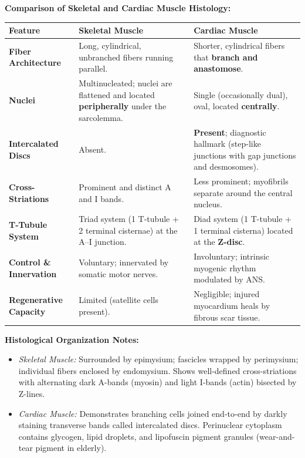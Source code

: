 \documentclass[11pt,a4paper]{article}
\begin{document}
\begin{ansbox}
\textbf{Comparison of Skeletal and Cardiac Muscle Histology:}
\begin{center}
\begin{tabularx}{\textwidth}{p{3.5cm}X X}
\toprule
\textbf{Feature} & \textbf{Skeletal Muscle} & \textbf{Cardiac Muscle} \\
\midrule
\textbf{Fiber Architecture} & Long, cylindrical, unbranched fibers running parallel. & Shorter, cylindrical fibers that \textbf{branch and anastomose}. \\
\textbf{Nuclei} & Multinucleated; nuclei are flattened and located \textbf{peripherally} under the sarcolemma. & Single (occasionally dual), oval, located \textbf{centrally}. \\
\textbf{Intercalated Discs} & Absent. & \textbf{Present}; diagnostic hallmark (step-like junctions with gap junctions and desmosomes). \\
\textbf{Cross-Striations} & Prominent and distinct A and I bands. & Less prominent; myofibrils separate around the central nucleus. \\
\textbf{T-Tubule System} & Triad system (1 T-tubule + 2 terminal cisternae) at the A--I junction. & Diad system (1 T-tubule + 1 terminal cisterna) located at the \textbf{Z-disc}. \\
\textbf{Control \& Innervation} & Voluntary; innervated by somatic motor nerves. & Involuntary; intrinsic myogenic rhythm modulated by ANS. \\
\textbf{Regenerative Capacity} & Limited (satellite cells present). & Negligible; injured myocardium heals by fibrous scar tissue. \\
\bottomrule
\end{tabularx}
\end{center}

\textbf{Histological Organization Notes:}
\begin{itemize}[leftmargin=*]
    \item \textit{Skeletal Muscle:} Surrounded by epimysium; fascicles wrapped by perimysium; individual fibers enclosed by endomysium. Shows well-defined cross-striations with alternating dark A-bands (myosin) and light I-bands (actin) bisected by Z-lines.
    \item \textit{Cardiac Muscle:} Demonstrates branching cells joined end-to-end by darkly staining transverse bands called intercalated discs. Perinuclear cytoplasm contains glycogen, lipid droplets, and lipofuscin pigment granules (wear-and-tear pigment in elderly).
\end{itemize}
\end{ansbox}
\end{document}

